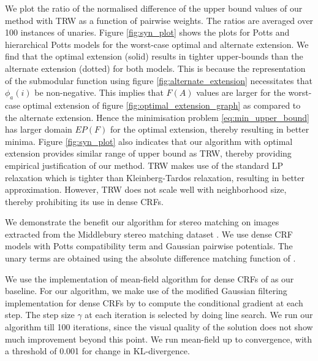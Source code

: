  We plot the ratio of the normalised difference of the upper
bound values of our method with TRW as a function of pairwise weights. The
ratios are averaged over 100 instances of unaries. Figure \ref{fig:syn_plot}
shows the plots for Potts and hierarchical Potts models for the worst-case
optimal and alternate extension. We find that the optimal extension (solid) results 
in tighter upper-bounds than the alternate extension (dotted) for both models.
This is because the representation of the submodular function using figure \ref{fig:alternate_extension} necessitates that $\phi_a(i)$ be non-negative. This implies that $F(A)$ values are larger
for the worst-case optimal extension of figure \ref{fig:optimal_extension_graph} as compared to the
alternate extension. Hence the minimisation problem \ref{eq:min_upper_bound}
has larger domain $EP(F)$ for the optimal extension, thereby resulting in better minima. Figure \ref{fig:syn_plot} also indicates that our algorithm with optimal extension provides similar range of upper bound as TRW, thereby providing empirical justification of our
method. TRW makes use of the standard LP relaxation \citep{chekuri2004linear} which is tighter than Kleinberg-Tardos relaxation, resulting in better approximation. However, TRW does not scale well with neighborhood size, thereby prohibiting its use in dense CRFs.

\clearpage
{}
\label{subsec:stereo}
 We demonstrate the benefit our algorithm for stereo matching on images extracted from the Middlebury stereo matching dataset \citep{scharstein2001taxonomy}. We use dense CRF models with Potts compatibility term and Gaussian pairwise potentials. The unary terms are obtained using the absolute difference matching function of \citep{scharstein2001taxonomy}. 

 We use the implementation of mean-field algorithm for
dense CRFs of \citep{koltun2011efficient} as our baseline. For our algorithm,
we make use of the modified Gaussian filtering implementation for dense CRFs by
\citep{ajanthan2017efficient} to compute the conditional gradient at each step.
The step size $\gamma$ at each iteration is selected by doing line search. We
run our algorithm till 100 iterations, since the visual quality of the solution
does not show much improvement beyond this point. We run mean-field up to
convergence, with a threshold of 0.001 for change in KL-divergence. 

